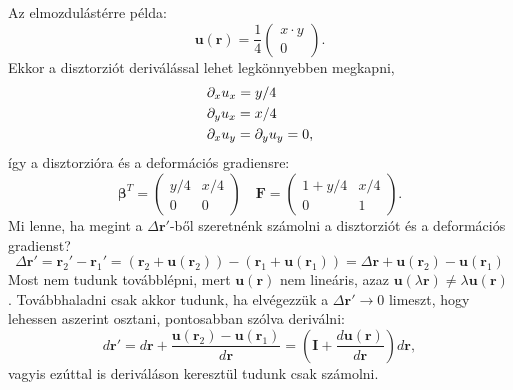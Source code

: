 \documentclass[12pt,a4paper]{scrartcl}
\let\mathbf\bm
\begin{document}
Az elmozdulástérre példa:
\[{\mathbf{u}}\left( {\mathbf{r}} \right) = \frac{1}{4}\left( {\begin{array}{*{20}{c}}
  {x \cdot y} \\ 
  0 
\end{array}} \right).\]
Ekkor a disztorziót deriválással lehet legkönnyebben megkapni,
\[\begin{gathered}
  {\partial _x}{u_x} = y/4 \hfill \\
  {\partial _y}{u_x} = x/4 \hfill \\
  {\partial _x}{u_y} = {\partial _y}{u_y} = 0, \hfill \\ 
\end{gathered} \]
így a disztorzióra és a deformációs gradiensre:
\[{{\mathbf{\beta }}^T} = \left( {\begin{array}{*{20}{c}}
  {y/4}&{x/4} \\ 
  0&0 
\end{array}} \right)\quad {\mathbf{F}} = \left( {\begin{array}{*{20}{c}}
  {1 + y/4}&{x/4} \\ 
  0&1 
\end{array}} \right).\]
\footnotesize
Mi lenne, ha megint a $\Delta {\mathbf{r}}'$-ből szeretnénk számolni a disztorziót és a deformációs gradienst?
\[\Delta {\mathbf{r}}' = {{\mathbf{r}}_2}' - {{\mathbf{r}}_1}' = \left( {{{\mathbf{r}}_2} + {\mathbf{u}}\left( {{{\mathbf{r}}_2}} \right)} \right) - \left( {{{\mathbf{r}}_1} + {\mathbf{u}}\left( {{{\mathbf{r}}_1}} \right)} \right) = \Delta {\mathbf{r}} + {\mathbf{u}}\left( {{{\mathbf{r}}_2}} \right) - {\mathbf{u}}\left( {{{\mathbf{r}}_1}} \right)\]
Most nem tudunk továbblépni, mert ${\mathbf{u}}\left( {\mathbf{r}} \right)$ nem lineáris, azaz ${\mathbf{u}}\left( {\lambda {\mathbf{r}}} \right) \ne \lambda {\mathbf{u}}\left( {\mathbf{r}} \right)$. Továbbhaladni csak akkor tudunk, ha elvégezzük a $\Delta {\mathbf{r}}' \to 0$ limeszt, hogy lehessen aszerint osztani, pontosabban szólva deriválni:
\[d{\mathbf{r}}' = d{\mathbf{r}} + \frac{{{\mathbf{u}}\left( {{{\mathbf{r}}_2}} \right) - {\mathbf{u}}\left( {{{\mathbf{r}}_1}} \right)}}{{d{\mathbf{r}}}} = \left( {{\mathbf{I}} + \frac{{d{\mathbf{u}}\left( {\mathbf{r}} \right)}}{{d{\mathbf{r}}}}} \right)d{\mathbf{r}},\]
vagyis ezúttal is deriváláson keresztül tudunk csak számolni.
\normalsize
\end{document}
